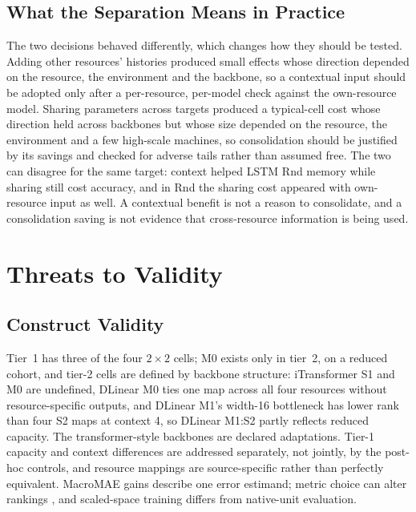 \documentclass[5p,twocolumn]{elsarticle}
\begin{document}
\subsection{What the Separation Means in Practice}
\label{sec:discussion-separability}

The two decisions behaved differently, which changes how they should be
tested. Adding other resources' histories produced small effects whose
direction depended on the resource, the environment and the backbone, so a
contextual input should be adopted only after a per-resource, per-model check
against the own-resource model. Sharing parameters across targets produced a
typical-cell cost whose direction held across backbones but whose size
depended on the resource, the environment and a few high-scale machines, so
consolidation should be justified by its savings and checked for adverse
tails rather than assumed free. The two can disagree for the same target:
context helped LSTM Rnd memory while sharing still cost accuracy, and in Rnd
the sharing cost appeared with own-resource input as well. A contextual
benefit is not a reason to consolidate, and a consolidation saving is not
evidence that
cross-resource information is being used.

\section{Threats to Validity}
\label{sec:threats}

\subsection{Construct Validity}
\label{sec:threats-construct}

Tier~1 has three of the four $2\times2$ cells; M0 exists only in tier~2, on a
reduced cohort, and tier-2 cells are defined by backbone structure:
iTransformer S1 and M0 are undefined, DLinear M0 ties one map across all four
resources without resource-specific outputs, and DLinear M1's width-16
bottleneck has lower rank than four S2 maps at context 4, so DLinear M1:S2
partly reflects reduced capacity. The transformer-style backbones are declared
adaptations. Tier-1 capacity and context differences are addressed
separately, not jointly, by the post-hoc controls, and resource mappings are
source-specific rather than perfectly equivalent. MacroMAE gains describe one
error estimand; metric choice can alter rankings \citep{Hyndman2006Accuracy},
and scaled-space training differs from native-unit evaluation.
\end{document}

